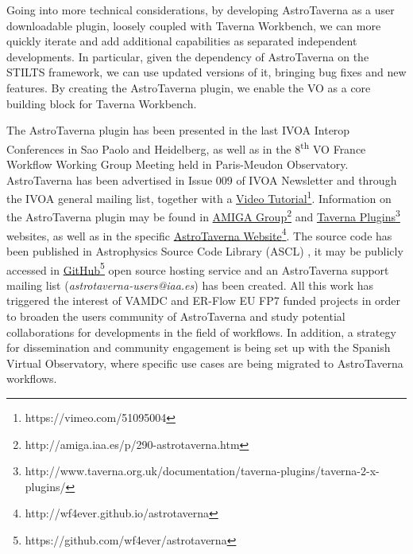 \documentclass{aa}
\begin{document}
Going into more technical considerations, by developing AstroTaverna as a user downloadable plugin, loosely coupled with Taverna Workbench, we can more quickly iterate and add additional capabilities as separated independent developments. In particular, given the dependency of AstroTaverna on the STILTS framework, we can use updated versions of it, bringing bug fixes and new features. By creating the AstroTaverna plugin, we enable the VO as a core building block for Taverna Workbench.

The AstroTaverna plugin has been presented in the last IVOA Interop Conferences in Sao Paolo and Heidelberg, as well as in the 8\textsuperscript{th} VO France Workflow Working Group Meeting held in Paris-Meudon Observatory. AstroTaverna has been advertised in Issue 009 of IVOA Newsletter and through the IVOA general mailing list, together with a \href{https://vimeo.com/51095004}{Video Tutorial}\footnote{https://vimeo.com/51095004}. Information on the AstroTaverna plugin may be found in \href{http://amiga.iaa.es/p/290-astrotaverna.htm}{AMIGA Group}\footnote{http://amiga.iaa.es/p/290-astrotaverna.htm} and \href{http://www.taverna.org.uk/documentation/taverna-plugins/taverna-2-x-plugins/}{Taverna Plugins}\footnote{http://www.taverna.org.uk/documentation/taverna-plugins/taverna-2-x-plugins/} websites, as well as in the specific \href{http://wf4ever.github.io/astrotaverna}{AstroTaverna Website}\footnote{http://wf4ever.github.io/astrotaverna}. The source code has been published in Astrophysics Source Code Library (ASCL) \citealt{Garrido2013}, it may be publicly accessed in \href{https://github.com/wf4ever/astrotaverna}{GitHub}\footnote{https://github.com/wf4ever/astrotaverna} open source hosting service and an AstroTaverna support mailing list (\textit{astrotaverna-users@iaa.es}) has been created.  All this work has triggered the interest of VAMDC and ER-Flow EU FP7 funded projects in order to broaden the users community of AstroTaverna and study potential collaborations for developments in the field of workflows. In addition, a strategy for dissemination and community engagement is being set up with the Spanish Virtual Observatory, where specific use cases are being migrated to AstroTaverna workflows.  
\end{document}
